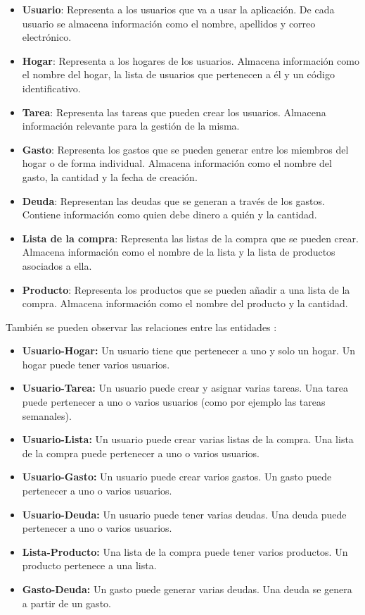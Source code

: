 \begin{itemize}
    \item \textbf{Usuario}: Representa a los usuarios que va a usar la aplicación. De cada usuario se almacena información como el nombre, apellidos y correo electrónico.
    \item \textbf{Hogar}: Representa a los hogares de los usuarios. Almacena información como el nombre del hogar, la lista de usuarios que pertenecen a él y un código identificativo.
    \item \textbf{Tarea}: Representa las tareas que pueden crear los usuarios. Almacena información relevante para la gestión de la misma.
    \item \textbf{Gasto}: Representa los gastos que se pueden generar entre los miembros del hogar o de forma individual. Almacena información como el nombre del gasto, la cantidad y la fecha de creación.
    \item \textbf{Deuda}: Representan las deudas que se generan a través de los gastos. Contiene información como quien debe dinero a quién y la cantidad.
    \item \textbf{Lista de la compra}: Representa las listas de la compra que se pueden crear. Almacena información como el nombre de la lista y la lista de productos asociados a ella.
    \item \textbf{Producto}: Representa los productos que se pueden añadir a una lista de la compra. Almacena información como el nombre del producto y la cantidad.
\end{itemize}

También se pueden observar las relaciones entre las entidades : 
\begin{itemize}
    \item \textbf{Usuario-Hogar:} Un usuario tiene que pertenecer a uno y solo un hogar. Un hogar puede tener varios usuarios.
    \item \textbf{Usuario-Tarea:} Un usuario puede crear y asignar varias tareas. Una tarea puede pertenecer a uno o varios usuarios (como por ejemplo las tareas semanales).
    \item \textbf{Usuario-Lista:} Un usuario puede crear varias listas de la compra. Una lista de la compra puede pertenecer a uno o varios usuarios.
    \item \textbf{Usuario-Gasto:} Un usuario puede crear varios gastos. Un gasto puede pertenecer a uno o varios usuarios.
    \item \textbf{Usuario-Deuda:} Un usuario puede tener varias deudas. Una deuda puede pertenecer a uno o varios usuarios.
    \item \textbf{Lista-Producto:} Una lista de la compra puede tener varios productos. Un producto pertenece a una lista.
    \item \textbf{Gasto-Deuda:} Un gasto puede generar varias deudas. Una deuda se genera a partir de un gasto.
\end{itemize}

